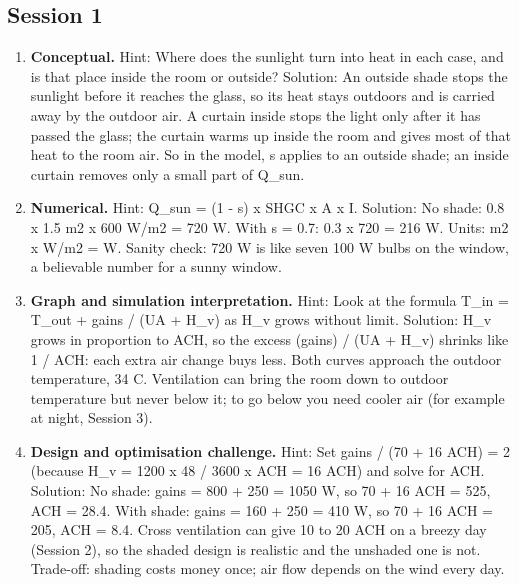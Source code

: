 \documentclass[11pt,a4paper]{article}
\begin{document}
\subsection*{Session 1}
\begin{enumerate}[nosep]
\item \textbf{Conceptual.} Hint: Where does the sunlight turn into heat in each case, and is that place inside the room or outside? Solution: An outside shade stops the sunlight before it reaches the glass, so its heat stays outdoors and is carried away by the outdoor air. A curtain inside stops the light only after it has passed the glass; the curtain warms up inside the room and gives most of that heat to the room air. So in the model, s applies to an outside shade; an inside curtain removes only a small part of Q\_sun.
\item \textbf{Numerical.} Hint: Q\_sun = (1 - s) x SHGC x A x I. Solution: No shade: 0.8 x 1.5 m2 x 600 W/m2 = 720 W. With s = 0.7: 0.3 x 720 = 216 W. Units: m2 x W/m2 = W. Sanity check: 720 W is like seven 100 W bulbs on the window, a believable number for a sunny window.
\item \textbf{Graph and simulation interpretation.} Hint: Look at the formula T\_in = T\_out + gains / (UA + H\_v) as H\_v grows without limit. Solution: H\_v grows in proportion to ACH, so the excess (gains) / (UA + H\_v) shrinks like 1 / ACH: each extra air change buys less. Both curves approach the outdoor temperature, 34 C. Ventilation can bring the room down to outdoor temperature but never below it; to go below you need cooler air (for example at night, Session 3).
\item \textbf{Design and optimisation challenge.} Hint: Set gains / (70 + 16 ACH) = 2 (because H\_v = 1200 x 48 / 3600 x ACH = 16 ACH) and solve for ACH. Solution: No shade: gains = 800 + 250 = 1050 W, so 70 + 16 ACH = 525, ACH = 28.4. With shade: gains = 160 + 250 = 410 W, so 70 + 16 ACH = 205, ACH = 8.4. Cross ventilation can give 10 to 20 ACH on a breezy day (Session 2), so the shaded design is realistic and the unshaded one is not. Trade-off: shading costs money once; air flow depends on the wind every day.
\end{enumerate}
\end{document}
